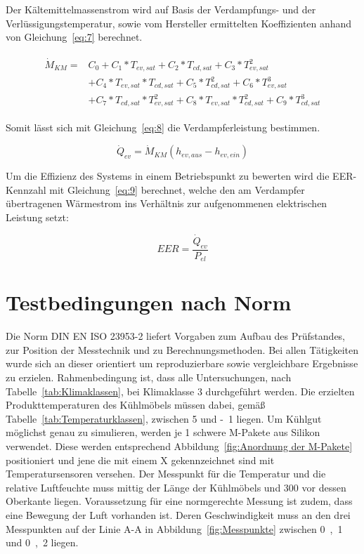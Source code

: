 Der Kältemittelmassenstrom wird auf Basis der Verdampfungs- und der Verlüssigungstemperatur, sowie vom Hersteller ermittelten Koeffizienten anhand von Gleichung~\ref{eq:7} berechnet.

\begin{align}
\label{eq:7}
	\begin{split}
	\dot{M}_{KM} = &C_0 + C_1*T_{ev,sat} + C_2*T_{cd,sat} + C_3*T_{ev,sat}^2 \\
	&+C_4*T_{ev,sat}*T_{cd,sat} + C_5*T_{cd,sat}^2 + C_6*T_{ev,sat}^3 \\
	&+ C_7*T_{cd,sat}*T_{ev,sat}^2 +C_8*T_{ev,sat}*T_{cd,sat}^2 + C_9*T_{cd,sat}^3
	\end{split}
\end{align}

Somit lässt sich mit Gleichung~\ref{eq:8} die Verdampferleistung bestimmen.

\begin{equation}
\label{eq:8}
\dot{Q}_{ev}= \dot{M}_{KM}(h_{ev,aus} - h_{ev,ein})
\end{equation}


Um die Effizienz des Systems in einem Betriebspunkt zu bewerten wird die EER-Kennzahl mit Gleichung~\ref{eq:9} berechnet, welche den am Verdampfer übertragenen Wärmestrom ins Verhältnis zur aufgenommenen elektrischen Leistung setzt\cite{Muller.2016}:

\begin{equation}
\label{eq:9}
EER = \frac{\dot{Q}_{ev}}{P_{el}}
\end{equation}



\section{Testbedingungen nach Norm}
\label{sec:Testbedingungen nach Norm}

Die Norm DIN EN ISO 23953-2 liefert Vorgaben zum Aufbau des Prüfstandes, zur Position der Messtechnik und zu Berechnungsmethoden. Bei allen Tätigkeiten wurde sich an dieser orientiert um reproduzierbare sowie vergleichbare Ergebnisse zu erzielen. Rahmenbedingung ist, dass alle Untersuchungen, nach Tabelle~\ref{tab:Klimaklassen}, bei Klimaklasse 3 durchgeführt werden. Die erzielten Produkttemperaturen des Kühlmöbels müssen dabei, gemäß Tabelle~\ref{tab:Temperaturklassen}, zwischen \unit{5}{\celsius} und \unit{-1}{\celsius} liegen.
Um Kühlgut möglichst genau zu simulieren, werden je \unit{1}{\kilogram} schwere M-Pakete aus Silikon verwendet.
Diese werden entsprechend Abbildung~\ref{fig:Anordnung der M-Pakete} positioniert und jene die mit einem X gekennzeichnet sind mit Temperatursensoren versehen.
Der Messpunkt für die Temperatur und die relative Luftfeuchte muss mittig der Länge der Kühlmöbels und \unit{300}{\milli\metre} vor dessen Oberkante liegen.
Voraussetzung für eine normgerechte Messung ist zudem, dass eine Bewegung der Luft vorhanden ist. Deren Geschwindigkeit muss an den drei Messpunkten auf der Linie A-A in Abbildung~\ref{fig:Messpunkte} zwischen \unit{0,1}{\meter\per\second} und \unit{0,2}{\meter\per\second} liegen\cite{DINDeutschesInstitutfurNormunge.V..}.

